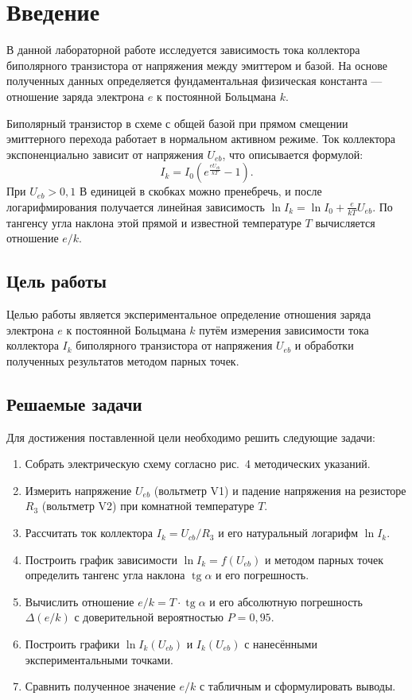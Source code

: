 \section{Введение}

В данной лабораторной работе исследуется зависимость тока коллектора биполярного транзистора от напряжения между эмиттером и базой. На основе полученных данных определяется фундаментальная физическая константа — отношение заряда электрона \(e\) к постоянной Больцмана \(k\).

Биполярный транзистор в схеме с общей базой при прямом смещении эмиттерного перехода работает в нормальном активном режиме. Ток коллектора экспоненциально зависит от напряжения \(U_{eb}\), что описывается формулой:
\[
I_k = I_0 \left( e^{\frac{eU_{eb}}{kT}} - 1 \right).
\]
При \(U_{eb} > 0{,}1\) В единицей в скобках можно пренебречь, и после логарифмирования получается линейная зависимость \(\ln I_k = \ln I_0 + \frac{e}{kT} U_{eb}\). По тангенсу угла наклона этой прямой и известной температуре \(T\) вычисляется отношение \(e/k\).

\subsection{Цель работы}

Целью работы является экспериментальное определение отношения заряда электрона \(e\) к постоянной Больцмана \(k\) путём измерения зависимости тока коллектора \(I_k\) биполярного транзистора от напряжения \(U_{eb}\) и обработки полученных результатов методом парных точек.

\subsection{Решаемые задачи}

Для достижения поставленной цели необходимо решить следующие задачи:
\begin{enumerate}
    \item Собрать электрическую схему согласно рис.~4 методических указаний.
    \item Измерить напряжение \(U_{eb}\) (вольтметр V1) и падение напряжения на резисторе \(R_3\) (вольтметр V2) при комнатной температуре \(T\).
    \item Рассчитать ток коллектора \(I_k = U_{cb}/R_3\) и его натуральный логарифм \(\ln I_k\).
    \item Построить график зависимости \(\ln I_k = f(U_{eb})\) и методом парных точек определить тангенс угла наклона \(\operatorname{tg}\alpha\) и его погрешность.
    \item Вычислить отношение \(e/k = T \cdot \operatorname{tg}\alpha\) и его абсолютную погрешность \(\Delta(e/k)\) с доверительной вероятностью \(P = 0{,}95\).
    \item Построить графики \(\ln I_k(U_{eb})\) и \(I_k(U_{eb})\) с нанесёнными экспериментальными точками.
    \item Сравнить полученное значение \(e/k\) с табличным и сформулировать выводы.
\end{enumerate}
